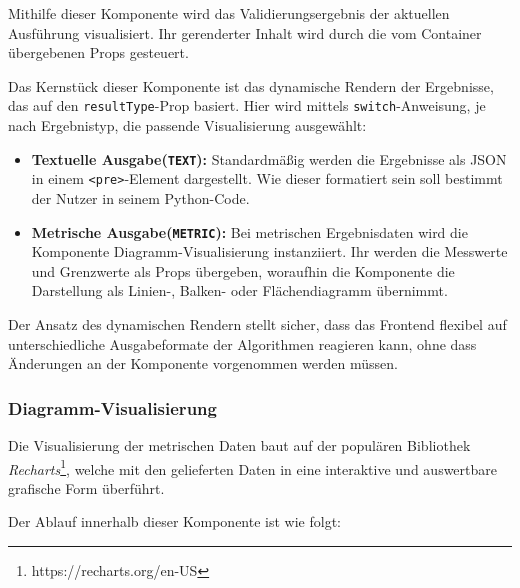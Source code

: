 Mithilfe dieser Komponente wird das Validierungsergebnis der aktuellen Ausführung visualisiert. Ihr gerenderter Inhalt wird durch die vom Container übergebenen Props gesteuert.

Das Kernstück dieser Komponente ist das dynamische Rendern der Ergebnisse, das auf den \texttt{resultType}-Prop basiert. Hier wird mittels \texttt{switch}-Anweisung, je nach Ergebnistyp, die passende Visualisierung ausgewählt:

\begin{itemize}
  \item \textbf{Textuelle Ausgabe(\texttt{TEXT}):} Standardmäßig werden die Ergebnisse als JSON in einem \texttt{<pre>}-Element dargestellt. Wie dieser formatiert sein soll bestimmt der Nutzer in seinem Python-Code.
  \item \textbf{Metrische Ausgabe(\texttt{METRIC}):} Bei metrischen Ergebnisdaten wird die Komponente Diagramm-Visualisierung instanziiert. Ihr werden die Messwerte und Grenzwerte als Props übergeben, woraufhin die Komponente die Darstellung als Linien-, Balken- oder Flächendiagramm übernimmt.
\end{itemize}

Der Ansatz des dynamischen Rendern stellt sicher, dass das Frontend flexibel auf unterschiedliche Ausgabeformate der Algorithmen reagieren kann, ohne dass Änderungen an der Komponente vorgenommen werden müssen.

\subsubsection*{Diagramm-Visualisierung}

Die Visualisierung der metrischen Daten baut auf der populären Bibliothek \textit{Recharts}\footnote{https://recharts.org/en-US}, welche mit den gelieferten Daten in eine interaktive und auswertbare grafische Form überführt.

Der Ablauf innerhalb dieser Komponente ist wie folgt:

